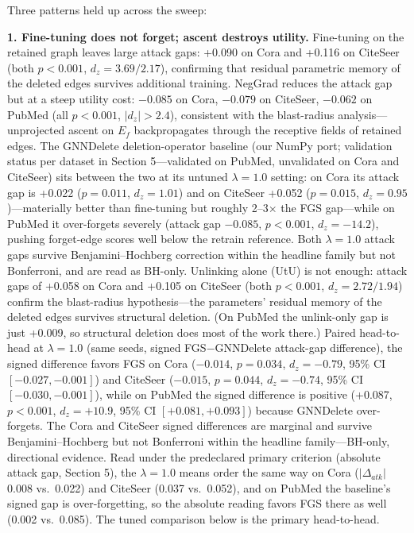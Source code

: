 \documentclass[pdflatex,sn-basic,Numbered]{sn-jnl}
\begin{document}
Three patterns held up across the sweep:

\textbf{1. Fine-tuning does not forget; ascent destroys utility.} Fine-tuning on the retained graph leaves large attack gaps: +0.090 on Cora and +0.116 on CiteSeer (both $p < 0.001$, $d_z = 3.69/2.17$), confirming that residual parametric memory of the deleted edges survives additional training. NegGrad reduces the attack gap but at a steep utility cost: $-0.085$ on Cora, $-0.079$ on CiteSeer, $-0.062$ on PubMed (all $p < 0.001$, $|d_z| > 2.4$), consistent with the blast-radius analysis---unprojected ascent on $E_f$ backpropagates through the receptive fields of retained edges. The GNNDelete deletion-operator baseline (our NumPy port; validation status per dataset in Section 5---validated on PubMed, unvalidated on Cora and CiteSeer) sits between the two at its untuned $\lambda = 1.0$ setting: on Cora its attack gap is +0.022 ($p = 0.011$, $d_z = 1.01$) and on CiteSeer +0.052 ($p = 0.015$, $d_z = 0.95$)---materially better than fine-tuning but roughly 2--3$\times$ the FGS gap---while on PubMed it over-forgets severely (attack gap $-0.085$, $p < 0.001$, $d_z = -14.2$), pushing forget-edge scores well below the retrain reference. Both $\lambda = 1.0$ attack gaps survive Benjamini--Hochberg correction within the headline family but not Bonferroni, and are read as BH-only. Unlinking alone (UtU) is not enough: attack gaps of +0.058 on Cora and +0.105 on CiteSeer (both $p < 0.001$, $d_z = 2.72/1.94$) confirm the blast-radius hypothesis---the parameters' residual memory of the deleted edges survives structural deletion. (On PubMed the unlink-only gap is just +0.009, so structural deletion does most of the work there.) Paired head-to-head at $\lambda = 1.0$ (same seeds, signed FGS$-$GNNDelete attack-gap difference), the signed difference favors FGS on Cora ($-0.014$, $p = 0.034$, $d_z = -0.79$, 95\% CI $[-0.027, -0.001]$) and CiteSeer ($-0.015$, $p = 0.044$, $d_z = -0.74$, 95\% CI $[-0.030, -0.001]$), while on PubMed the signed difference is positive (+0.087, $p < 0.001$, $d_z = +10.9$, 95\% CI $[+0.081, +0.093]$) because GNNDelete over-forgets. The Cora and CiteSeer signed differences are marginal and survive Benjamini--Hochberg but not Bonferroni within the headline family---BH-only, directional evidence. Read under the predeclared primary criterion (absolute attack gap, Section 5), the $\lambda = 1.0$ means order the same way on Cora ($|\Delta_{atk}|$ 0.008 vs.\ 0.022) and CiteSeer (0.037 vs.\ 0.052), and on PubMed the baseline's signed gap is over-forgetting, so the absolute reading favors FGS there as well (0.002 vs.\ 0.085). The tuned comparison below is the primary head-to-head.
\end{document}
